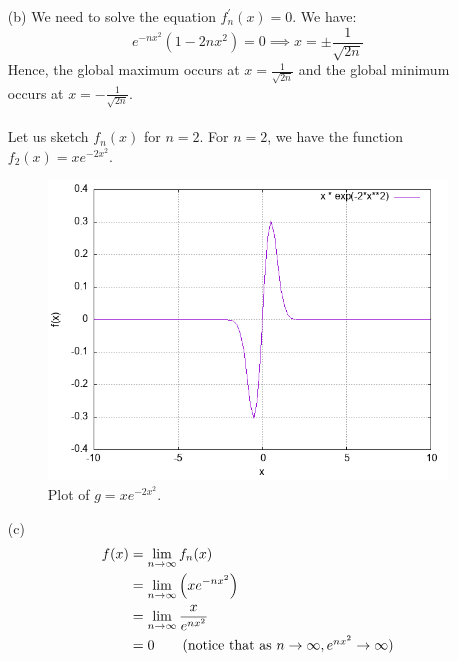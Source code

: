 \documentclass[11pt]{article}
\begin{document}
\begin{itemize}
\begin{itemize}
            \item[(b)]
                We need to solve the equation $f^\prime_n(x) = 0$.
                We have:
                \begin{equation*}
                    e^{-nx^2}(1 - 2nx^2) = 0 \implies x = \pm \frac{1}{\sqrt{2n}}
                \end{equation*}
                Hence, the global maximum occurs at $x = \frac{1}{\sqrt{2n}}$
                and the global minimum occurs at $x = -\frac{1}{\sqrt{2n}}$.
                \\
                \\
                Let us sketch $f_n(x)$ for $n = 2$. For $n = 2$, we have the
                function $f_2(x) = xe^{-2x^2}$.
                \begin{figure}[H]
                    \centering
                    \includegraphics[width=0.7\linewidth]{plot.png}
                    \caption{Plot of $g = xe^{-2x^2}$.}
                \end{figure}

            \item[(c)]
                \begin{align*} 
                    f(x) &= \lim_{n \to \infty} f_n(x)\\
                         &= \lim_{n \to \infty} \Big(xe^{-nx^2}\Big)\\
                         &= \lim_{n \to \infty} \frac{x}{e^{nx^2}}\\
                         &= 0
                     \tag{notice that as $n \to \infty, e^{nx^2} \to \infty$}
                \end{align*} 

            \clearpage


\end{itemize}
\end{itemize}
\end{document}
